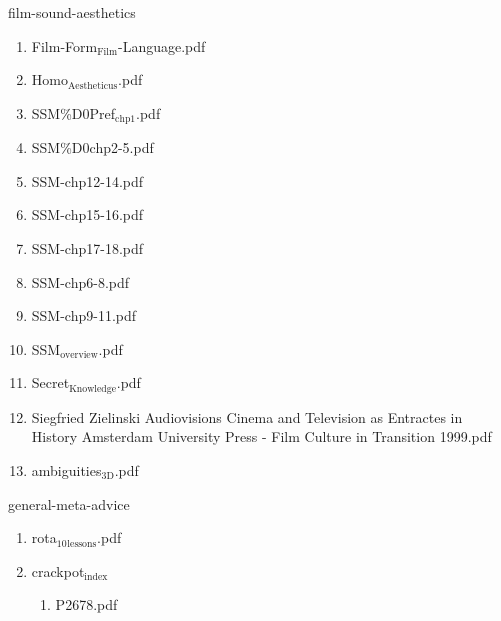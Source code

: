 \documentclass[11pt]{article}
\begin{document}
\item film-sound-aesthetics
\label{sec-1-1-1-1-11-21}
\begin{enumerate}
\item Film-Form$_{\text{Film}}$-Language.pdf
\label{sec-1-1-1-1-11-21-1}

\item Homo$_{\text{Aestheticus}}$.pdf
\label{sec-1-1-1-1-11-21-2}

\item SSM\%D0Pref$_{\text{chp1}}$.pdf
\label{sec-1-1-1-1-11-21-3}

\item SSM\%D0chp2-5.pdf
\label{sec-1-1-1-1-11-21-4}

\item SSM-chp12-14.pdf
\label{sec-1-1-1-1-11-21-5}

\item SSM-chp15-16.pdf
\label{sec-1-1-1-1-11-21-6}

\item SSM-chp17-18.pdf
\label{sec-1-1-1-1-11-21-7}

\item SSM-chp6-8.pdf
\label{sec-1-1-1-1-11-21-8}

\item SSM-chp9-11.pdf
\label{sec-1-1-1-1-11-21-9}

\item SSM$_{\text{overview}}$.pdf
\label{sec-1-1-1-1-11-21-10}

\item Secret$_{\text{Knowledge}}$.pdf
\label{sec-1-1-1-1-11-21-11}

\item Siegfried Zielinski Audiovisions Cinema and Television as Entractes in History Amsterdam University Press - Film Culture in Transition  1999.pdf
\label{sec-1-1-1-1-11-21-12}

\item ambiguities$_{\text{3D}}$.pdf
\label{sec-1-1-1-1-11-21-13}
\end{enumerate}

\item general-meta-advice
\label{sec-1-1-1-1-11-22}
\begin{enumerate}
\item rota$_{\text{10}}$$_{\text{lessons}}$.pdf
\label{sec-1-1-1-1-11-22-1}

\item crackpot$_{\text{index}}$
\label{sec-1-1-1-1-11-22-2}
\begin{enumerate}
\item P2678.pdf
\label{sec-1-1-1-1-11-22-2-1}
\end{enumerate}
\end{enumerate}
\end{document}
